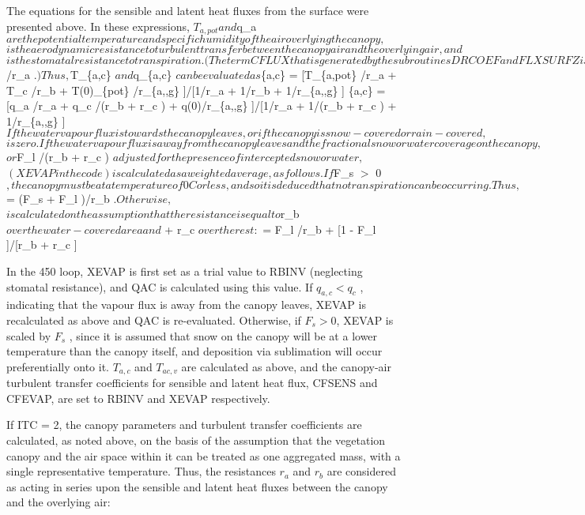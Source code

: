 The equations for the sensible and latent heat fluxes from the surface were presented above. In these expressions, $T_{a,pot} and $q\+\_\+a $ are the potential temperature and specific humidity of the air overlying the canopy, $ $ is the aerodynamic resistance to turbulent transfer between the canopy air and the overlying air, and $ $ is the stomatal resistance to transpiration. (The term CFLUX that is generated by the subroutines DRCOEF and FLXSURFZ is equivalent to $/r\+\_\+a $ .) Thus, $T\+\_\+\{a,c\} $ and $q\+\_\+\{a,c\} $ can be evaluated as $\{a,c\} = \mbox{[}T\+\_\+\{a,pot\} /r\+\_\+a + T\+\_\+c /r\+\_\+b + T(0)\+\_\+\{pot\} /r\+\_\+\{a,,g\} \mbox{]}/\mbox{[}1/r\+\_\+a + 1/r\+\_\+b + 1/r\+\_\+\{a,,g\} \mbox{]} $ $\{a,c\} = \mbox{[}q\+\_\+a /r\+\_\+a + q\+\_\+c /(r\+\_\+b + r\+\_\+c ) + q(0)/r\+\_\+\{a,,g\} \mbox{]}/\mbox{[}1/r\+\_\+a + 1/(r\+\_\+b + r\+\_\+c ) + 1/r\+\_\+\{a,,g\} \mbox{]} $ If the water vapour flux is towards the canopy leaves, or if the canopy is snow-covered or rain-covered, $ $ is zero. If the water vapour flux is away from the canopy leaves and the fractional snow or water coverage on the canopy, $ $ or $F\+\_\+l /(r\+\_\+b + r\+\_\+c ) $ adjusted for the presence of intercepted snow or water, $ $ (XEVAP in the code) is calculated as a weighted average, as follows. If $F\+\_\+s $>$ 0 $, the canopy must be at a temperature of 0 C or less, and so it is deduced that no transpiration can be occurring. Thus, $ = (F\+\_\+s + F\+\_\+l )/r\+\_\+b $ . Otherwise, $ $ is calculated on the assumption that the resistance is equal to $r\+\_\+b $ over the water-covered area and $ + r\+\_\+c $ over the rest: $ = F\+\_\+l /r\+\_\+b + \mbox{[}1 -\/ F\+\_\+l \mbox{]}/\mbox{[}r\+\_\+b + r\+\_\+c \mbox{]}

In the 450 loop, X\+E\+V\+A\+P is first set as a trial value to R\+B\+I\+N\+V (neglecting stomatal resistance), and Q\+A\+C is calculated using this value. If $q_{a,c} < q_c$ , indicating that the vapour flux is away from the canopy leaves, X\+E\+V\+A\+P is recalculated as above and Q\+A\+C is re-\/evaluated. Otherwise, if $F_s > 0$, X\+E\+V\+A\+P is scaled by $F_s$ , since it is assumed that snow on the canopy will be at a lower temperature than the canopy itself, and deposition via sublimation will occur preferentially onto it. $T_{a,c}$ and $T_{ac,v}$ are calculated as above, and the canopy-\/air turbulent transfer coefficients for sensible and latent heat flux, C\+F\+S\+E\+N\+S and C\+F\+E\+V\+A\+P, are set to R\+B\+I\+N\+V and X\+E\+V\+A\+P respectively.

If I\+T\+C = 2, the canopy parameters and turbulent transfer coefficients are calculated, as noted above, on the basis of the assumption that the vegetation canopy and the air space within it can be treated as one aggregated mass, with a single representative temperature. Thus, the resistances $r_a$ and $r_b$ are considered as acting in series upon the sensible and latent heat fluxes between the canopy and the overlying air\+:

